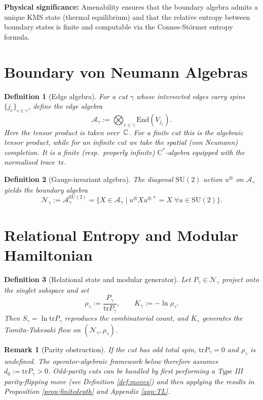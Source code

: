 \documentclass[11pt]{article}
\newtheorem{definition}{Definition}[section]
\newtheorem{remark}{Remark}[section]
\begin{document}
\textbf{Physical significance:} Amenability ensures that the boundary algebra admits
a unique KMS state (thermal equilibrium) and that the relative entropy between
boundary states is finite and computable via the Connes-Störmer entropy formula.


\section{Boundary von Neumann Algebras}

\begin{definition}[Edge algebra]
For a cut $\gamma$ whose intersected edges carry spins
$\{j_e\}_{e\in\gamma}$, define the \emph{edge algebra}
\[
  \mathcal A_{\gamma}
  := \bigotimes_{e\in\gamma} \mathrm{End}(V_{j_e}).
\]
Here the tensor product is taken over~$\Bbb C$.
For a finite cut this is the algebraic tensor product,
while for an infinite cut we take the spatial (von Neumann) completion.
It is a finite (resp.\ properly infinite) $\mathrm C^\ast$-algebra
equipped with the normalised trace~$\mathrm{tr}$.
\end{definition}

\begin{definition}[Gauge-invariant algebra]
The diagonal $\mathrm{SU}(2)$ action $u^{\otimes}$ on
$\mathcal A_\gamma$ yields the \emph{boundary algebra}
\[
  \mathcal N_{\gamma} := 
  \mathcal A_{\gamma}^{\mathrm{SU}(2)}
  =
  \{X\in\mathcal A_{\gamma}\mid
    u^{\otimes} X u^{\otimes\,*}=X\;\forall u\in \mathrm{SU}(2)\}.
\]
\end{definition}

\section{Relational Entropy and Modular Hamiltonian}

\begin{definition}[Relational state and modular generator]
Let $P_{\gamma}\in\mathcal N_{\gamma}$ project onto the singlet subspace and set
\[
  \rho_{\gamma}:=\frac{P_{\gamma}}{\mathrm{tr}P_{\gamma}},\qquad
  K_{\gamma}:=-\ln\rho_{\gamma}.
\]
Then $S_{\gamma}=\ln\mathrm{tr}P_{\gamma}$ reproduces the combinatorial count,
and $K_{\gamma}$ generates the Tomita-Takesaki flow on
$(\mathcal N_{\gamma},\rho_{\gamma})$.
\end{definition}

\begin{remark}[Parity obstruction]\label{rem:parity}
If the cut has \emph{odd} total spin, $\mathrm{tr}P_{\gamma}=0$ and
$\rho_{\gamma}$ is undefined.
The operator-algebraic framework below therefore assumes
$d_0:=\mathrm{tr}P_{\gamma}>0$.
Odd-parity cuts can be handled by first performing a Type III
parity-flipping move (see Definition \ref{def:moves}) and then applying the
results in Proposition \ref{prop:finitedepth} and Appendix \ref{app:TL}.
\end{remark}
\end{document}
